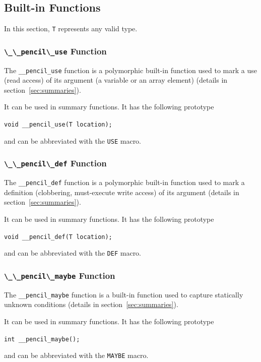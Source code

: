 \subsection{Built-in Functions}

In this section, \lstinline!T! represents any valid \pencil type.

\subsubsection{\lstinline!\_\_pencil\_use! Function}

  The \lstinline!__pencil_use! function is
  a polymorphic built-in function used to mark a use (read access) of
  its argument (a variable or an array element)
  (details in section~\ref{sec:summaries}).

  It can be used in summary functions.
  It has the following prototype
  
  \lstinline!void __pencil_use(T location);!
  
  and can be abbreviated with the
  \lstinline!USE! macro.


\subsubsection{\lstinline!\_\_pencil\_def! Function}

  The \lstinline!__pencil_def! function is a polymorphic
  built-in function used to mark a definition (clobbering, must-execute write
  access) of its argument (details in
  section~\ref{sec:summaries}).
  
  It can be used in summary functions.
  It has the following prototype
  
  \lstinline!void __pencil_def(T location);!
  
  and can be abbreviated with the
  \lstinline!DEF! macro.

\subsubsection{\lstinline!\_\_pencil\_maybe! Function}

  The \lstinline!__pencil_maybe! function is
  a built-in function used to capture statically unknown conditions
  (details in section~\ref{sec:summaries}).

  It can be used in summary functions.
  It has the following prototype
  
  \lstinline!int __pencil_maybe();!
  
  and can be abbreviated with the \lstinline!MAYBE! macro.

